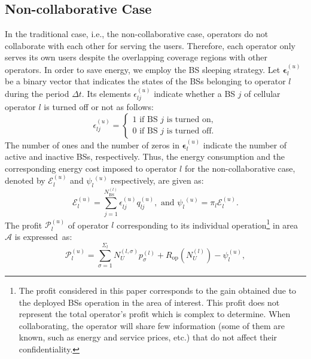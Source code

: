 \documentclass[10pt, letter, twocolumn]{IEEEtran}
\begin{document}
\subsection{Non-collaborative Case}
In the traditional case, i.e., the non-collaborative case, operators do not collaborate with each other for serving the users. Therefore, each operator only serves its own users despite the overlapping coverage regions with other operators. In order to save energy, we employ the BS sleeping strategy. Let $\boldsymbol{\epsilon}_l^{(u)}$ be a binary vector that indicates the states of the BSs belonging to operator $l$ during the period $\Delta t$. Its elements $\epsilon_{lj}^{(u)}$ indicate whether a BS $j$ of cellular operator $l$ is turned off or not as follows:
\begin{equation}
\epsilon_{lj}^{(u)}=\left\{
\begin{array}{l}
  1 \mbox{      if BS $j$ is turned on},\\
  0 \mbox{      if BS $j$ is turned off}.
\end{array}\right.
\end{equation}
The number of ones and the number of zeros in $\boldsymbol{\epsilon}_l^{(u)}$ indicate the number of active and inactive BSs, respectively. Thus, the energy consumption and the corresponding energy cost imposed to operator $l$ for the non-collaborative case, denoted by ${\mathcal E}_{l}^{(u)}$ and ${\mathcal \psi_{l}}^{(u)}$ respectively, are given as:
\begin{equation}
{\mathcal E}_{l}^{(u)}=\sum_{j=1}^{N_{\mathrm{BS}}^{(l)}}\epsilon^{(u)}_{lj} q_{lj}^{(u)},\mbox{ and }
{\mathcal \psi_{l}}^{(u)}=\pi_{l}{\mathcal E}_{l}^{(u)}.
\label{Energy_uncoop}
\end{equation}
The profit ${\mathcal P}_l^{(u)}$ of operator $l$ corresponding to its individual operation\footnote{The profit considered in this paper corresponds to the gain obtained due to the deployed BSs operation in the area of interest. This profit does not represent the total operator's profit which is complex to determine. When collaborating, the operator will share few information (some of them are known, such as energy and service prices, etc.) that do not affect their confidentiality.} in area $\mathcal{A}$ is expressed~as:
\begin{equation}
{\mathcal P}_l^{(u)}=\sum_{\sigma=1}^{\Sigma_l}N_U^{(l,\sigma)} p^{(l)}_\sigma+R_{\mathrm{op}}\left(N_U^{(l)}\right)-{\psi}_{l}^{(u)},
\label{profit_uncoop_eq}
\end{equation}
\normalsize
\end{document}

